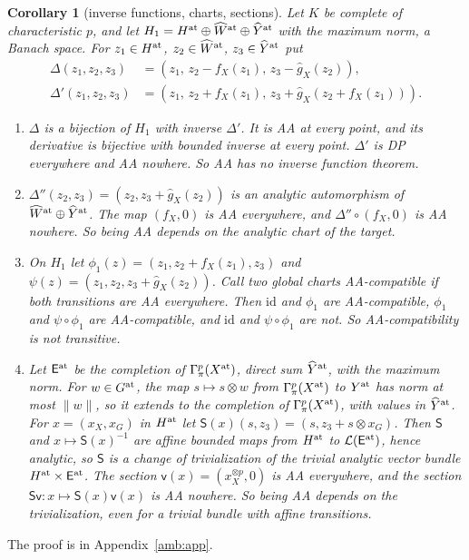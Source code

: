 \documentclass[11pt]{amsart}
\newtheorem{corollary}[theorem]{Corollary}
\theoremstyle{definition}
\theoremstyle{remark}
\numberwithin{equation}{section}
\newcommand{\cL}{\mathcal L}
\newcommand{\id}{\mathrm{id}}
\newcommand{\norm}[1]{\lVert #1\rVert}
\theoremstyle{plain}
\theoremstyle{definition}
\theoremstyle{plain}
\begin{document}
\begin{corollary}[inverse functions, charts, sections]\label{amb:cor:charts}
Let $K$ be complete of characteristic $p$, and let $H_1=H^{\rm at}\oplus\widehat W^{\rm at}\oplus\widehat Y^{\rm at}$ with the maximum norm, a Banach space. For $z_1\in H^{\rm at}$, $z_2\in\widehat W^{\rm at}$, $z_3\in\widehat Y^{\rm at}$ put
\begin{equation}\label{amb:eq:delta}
\begin{aligned}
 \Delta(z_1,z_2,z_3)&=(z_1,\,z_2-f_X(z_1),\,z_3-\hat g_X(z_2)),\\
 \Delta'(z_1,z_2,z_3)&=(z_1,\,z_2+f_X(z_1),\,z_3+\hat g_X(z_2+f_X(z_1))).
\end{aligned}
\end{equation}
\begin{enumerate}
\item $\Delta$ is a bijection of $H_1$ with inverse $\Delta'$. It is AA at every point, and its derivative is bijective with bounded inverse at every point. $\Delta'$ is DP everywhere and AA nowhere. So AA has no inverse function theorem.
\item $\Delta''(z_2,z_3)=(z_2,z_3+\hat g_X(z_2))$ is an analytic automorphism of $\widehat W^{\rm at}\oplus\widehat Y^{\rm at}$. The map $(f_X,0)$ is AA everywhere, and $\Delta''\circ(f_X,0)$ is AA nowhere. So being AA depends on the analytic chart of the target.
\item On $H_1$ let $\phi_1(z)=(z_1,z_2+f_X(z_1),z_3)$ and $\psi(z)=(z_1,z_2,z_3+\hat g_X(z_2))$. Call two global charts AA-compatible if both transitions are AA everywhere. Then $\id$ and $\phi_1$ are AA-compatible, $\phi_1$ and $\psi\circ\phi_1$ are AA-compatible, and $\id$ and $\psi\circ\phi_1$ are not. So AA-compatibility is not transitive.
\item Let $\mathsf E^{\rm at}$ be the completion of $\Gamma^p_\pi(X^{\rm at})$, direct sum $\widehat Y^{\rm at}$, with the maximum norm. For $w\in G^{\rm at}$, the map $s\mapsto s\otimes w$ from $\Gamma^p_\pi(X^{\rm at})$ to $Y^{\rm at}$ has norm at most $\norm w$, so it extends to the completion of $\Gamma^p_\pi(X^{\rm at})$, with values in $\widehat Y^{\rm at}$. For $x=(x_X,x_G)$ in $H^{\rm at}$ let $\mathsf S(x)(s,z_3)=(s,z_3+s\otimes x_G)$. Then $\mathsf S$ and $x\mapsto\mathsf S(x)^{-1}$ are affine bounded maps from $H^{\rm at}$ to $\cL(\mathsf E^{\rm at})$, hence analytic, so $\mathsf S$ is a change of trivialization of the trivial analytic vector bundle $H^{\rm at}\times\mathsf E^{\rm at}$. The section $\mathsf v(x)=(x_X^{\otimes p},0)$ is AA everywhere, and the section $\mathsf S\mathsf v\colon x\mapsto\mathsf S(x)\mathsf v(x)$ is AA nowhere. So being AA depends on the trivialization, even for a trivial bundle with affine transitions.
\end{enumerate}
\end{corollary}
The proof is in Appendix~\ref{amb:app}.
\end{document}
